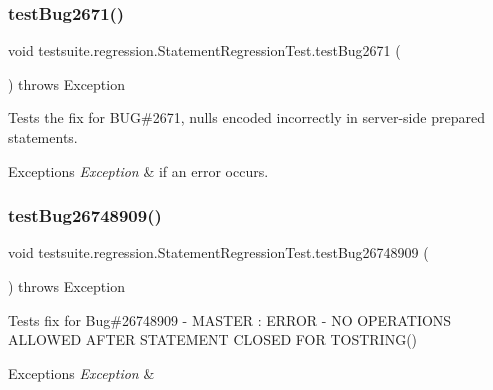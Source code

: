 \subsubsection{\texorpdfstring{test\+Bug2671()}{testBug2671()}}
{\footnotesize\ttfamily void testsuite.\+regression.\+Statement\+Regression\+Test.\+test\+Bug2671 (\begin{DoxyParamCaption}{ }\end{DoxyParamCaption}) throws Exception}

Tests the fix for B\+UG\#2671, nulls encoded incorrectly in server-\/side prepared statements.


\begin{DoxyExceptions}{Exceptions}
{\em Exception} & if an error occurs. \\
\hline
\end{DoxyExceptions}
\mbox{\label{classtestsuite_1_1regression_1_1_statement_regression_test_a5008a06c6bd62560f9ffcbbc16be7495}} 
\subsubsection{\texorpdfstring{test\+Bug26748909()}{testBug26748909()}}
{\footnotesize\ttfamily void testsuite.\+regression.\+Statement\+Regression\+Test.\+test\+Bug26748909 (\begin{DoxyParamCaption}{ }\end{DoxyParamCaption}) throws Exception}

Tests fix for Bug\#26748909 -\/ M\+A\+S\+T\+ER \+: E\+R\+R\+OR -\/ NO O\+P\+E\+R\+A\+T\+I\+O\+NS A\+L\+L\+O\+W\+ED A\+F\+T\+ER S\+T\+A\+T\+E\+M\+E\+NT C\+L\+O\+S\+ED F\+OR T\+O\+S\+T\+R\+I\+N\+G()


\begin{DoxyExceptions}{Exceptions}
{\em Exception} & \\
\hline
\end{DoxyExceptions}
\mbox{\label{classtestsuite_1_1regression_1_1_statement_regression_test_aed1e01598c9eb8bf849b56e0646f302c}} 
